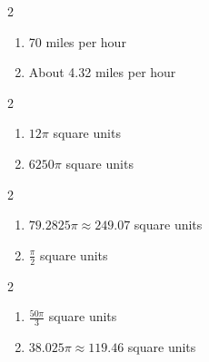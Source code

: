\documentclass{ximera}
\begin{document}
\begin{multicols}{2}

\begin{enumerate}

\setcounter{enumi}{\value{HW}}

\item 70 miles per hour
\item About 4.32 miles per hour

\setcounter{HW}{\value{enumi}}

\end{enumerate}

\end{multicols}

\begin{multicols}{2}

\begin{enumerate}

\setcounter{enumi}{\value{HW}}

\addtocounter{enumi}{1}

\item $12\pi$ square units
\item $6250\pi$ square units 

\setcounter{HW}{\value{enumi}}

\end{enumerate}

\end{multicols}

\begin{multicols}{2}

\begin{enumerate}

\setcounter{enumi}{\value{HW}}

\item $79.2825\pi \approx 249.07$ square units 
\item $\frac{\pi}{2}$ square units

\setcounter{HW}{\value{enumi}}

\end{enumerate}

\end{multicols}

\enlargethispage{0.25in}

\vspace{-0.25in}

\begin{multicols}{2}

\begin{enumerate}

\setcounter{enumi}{\value{HW}}

\item $\frac{50\pi}{3}$ square units
\item $38.025 \pi \approx 119.46$ square units 

\end{enumerate}

\end{multicols}
\end{document}
